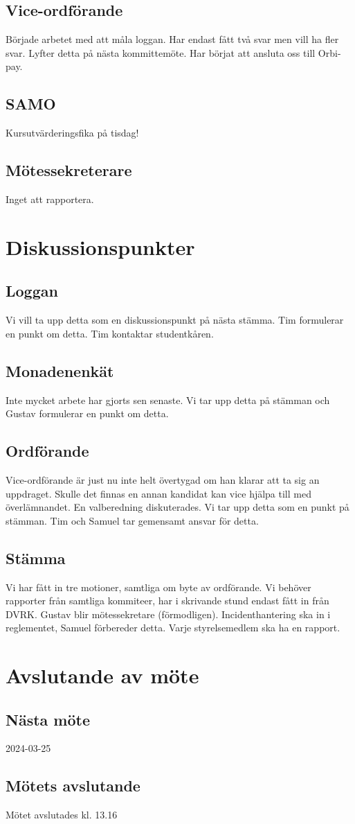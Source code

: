 \documentclass[protokoll]{dvd}
\begin{document}
\subsection{Vice-ordförande}
Började arbetet med att måla loggan. Har endast fått två svar men vill ha fler svar. Lyfter detta på nästa kommittemöte. 
Har börjat att ansluta oss till Orbi-pay.

\subsection{SAMO}
Kursutvärderingsfika på tisdag!

\subsection{Mötessekreterare}
Inget att rapportera.

\newpage


\section{Diskussionspunkter}

\subsection*{Loggan}
Vi vill ta upp detta som en diskussionspunkt på nästa stämma. Tim formulerar en punkt om detta.
Tim kontaktar studentkåren.

\subsection*{Monadenenkät}
Inte mycket arbete har gjorts sen senaste. Vi tar upp detta på stämman och Gustav formulerar en punkt om detta.

\subsection*{Ordförande}
Vice-ordförande är just nu inte helt övertygad om han klarar att ta sig an uppdraget.
Skulle det finnas en annan kandidat kan vice hjälpa till med överlämnandet.
En valberedning diskuterades. Vi tar upp detta som en punkt på stämman.
Tim och Samuel tar gemensamt ansvar för detta.

\subsection*{Stämma}
Vi har fått in tre motioner, samtliga om byte av ordförande.
Vi behöver rapporter från samtliga kommiteer, har i skrivande stund endast fått in från DVRK.
Gustav blir mötessekretare (förmodligen).
Incidenthantering ska in i reglementet, Samuel förbereder detta.
Varje styrelsemedlem ska ha en rapport.


\newpage
\section{Avslutande av möte}

\subsection{Nästa möte}
2024-03-25

\subsection{Mötets avslutande}
Mötet avslutades kl. 13.16

\styrelsesignaturer
\end{document}
